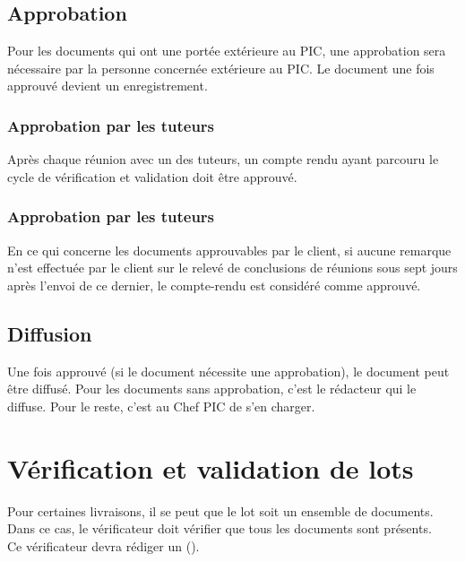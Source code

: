 \subsection{Approbation}

Pour les documents qui ont une portée extérieure au PIC, une approbation sera nécessaire par la personne concernée extérieure au PIC. Le document une fois approuvé devient un enregistrement.

\subsubsection*{Approbation par les tuteurs}
Après chaque réunion avec un des tuteurs, un compte rendu ayant parcouru le cycle de
vérification et validation doit être approuvé.


\subsubsection*{Approbation par les tuteurs}
En ce qui concerne les documents approuvables par le client, si aucune remarque n'est effectuée
par le client sur le relevé de conclusions de réunions sous sept jours après l'envoi de ce dernier,
le compte-rendu est considéré comme approuvé.

\subsection{Diffusion}
Une fois approuvé (si le document nécessite une approbation), le document peut être diffusé.
Pour les documents sans approbation, c'est le rédacteur qui le diffuse. Pour le reste, c'est au
Chef PIC de s'en charger.

\section{Vérification et validation de lots}
Pour certaines livraisons, il se peut que le lot soit un ensemble de documents. Dans ce cas,
le vérificateur doit vérifier que tous les documents sont présents.
\\
Ce vérificateur devra rédiger un \PVVV (\PVVVCourt).